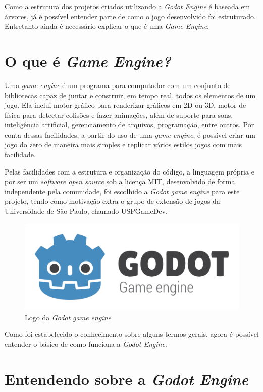 Como a estrutura dos projetos criados utilizando a \textit{Godot Engine} é 
baseada em árvores, já é possível entender parte de como o jogo desenvolvido foi 
estruturado. Entretanto ainda é necessário explicar o que é uma 
\textit{Game Engine}.


\section{O que é \textit{Game Engine?}}

Uma \textit{game engine} é um programa para computador com um conjunto de 
bibliotecas capaz de juntar e construir, em tempo real, todos os elementos de um
jogo.
Ela inclui motor gráfico para renderizar gráficos em 2D ou 3D, motor de física 
para detectar colisões e fazer animações, além de suporte para sons, 
inteligência artificial, gerenciamento de arquivos, programação, entre outros.
Por conta dessas facilidades, a partir do uso de uma \textit{game engine}, é 
possível criar um jogo do zero de maneira mais simples e replicar vários estilos
jogos com mais facilidade.

Pelas facilidades com a estrutura e organização do código, a linguagem própria 
e por ser um \textit{software open source} sob a licença MIT, desenvolvido de 
forma independente pela comunidade, foi escolhido a
\textit{Godot game engine} para este projeto, tendo como motivação extra o grupo
de extensão de jogos da Universidade de São Paulo, chamado USPGameDev.

\begin{figure}[H]
    \includegraphics[scale=0.25]{../figuras/godot_logo.png}
    \caption{Logo da \textit{Godot game engine}}
\end{figure}


Como foi estabelecido o conhecimento sobre alguns termos gerais, agora é
possível entender o básico de como funciona a \textit{Godot Engine}.

\section{Entendendo sobre a \textit{Godot Engine}}

